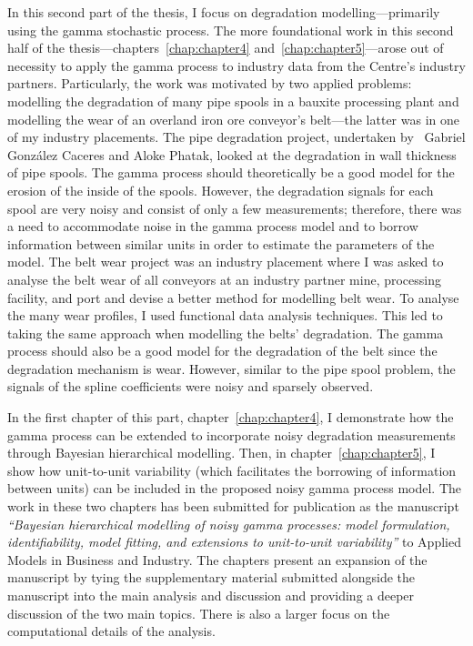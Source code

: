 \documentclass[apa,colorlinks,emptypage]{curtinThesis}
\begin{document}
In this second part of the thesis, I focus on degradation modelling---primarily using the gamma stochastic process. The more foundational work in this second half of the thesis---chapters~\ref{chap:chapter4} and~\ref{chap:chapter5}---arose out of necessity to apply the gamma process to industry data from the Centre's industry partners. Particularly, the work was motivated by two applied problems: modelling the degradation of many pipe spools in a bauxite processing plant and modelling the wear of an overland iron ore conveyor's belt---the latter was in one of my industry placements. The pipe degradation project, undertaken by  Gabriel Gonz\'{a}lez Caceres and Aloke Phatak, looked at the degradation in wall thickness of pipe spools. The gamma process should theoretically be a good model for the erosion of the inside of the spools. However, the degradation signals for each spool are very noisy and consist of only a few measurements; therefore, there was a need to accommodate noise in the gamma process model and to borrow information between similar units in order to estimate the parameters of the model. The belt wear project was an industry placement where I was asked to analyse the belt wear of all conveyors at an industry partner mine, processing facility, and port and devise a better method for modelling belt wear. To analyse the many wear profiles, I used functional data analysis techniques. This led to taking the same approach when modelling the belts' degradation. The gamma process should also be a good model for the degradation of the belt since the degradation mechanism is wear. However, similar to the pipe spool problem, the signals of the spline coefficients were noisy and sparsely observed.

In the first chapter of this part, chapter~\ref{chap:chapter4}, I demonstrate how the gamma process can be extended to incorporate noisy degradation measurements through Bayesian hierarchical modelling. Then, in chapter~\ref{chap:chapter5}, I show how unit-to-unit variability (which facilitates the borrowing of information between units) can be included in the proposed noisy gamma process model. The work in these two chapters has been submitted for publication as the manuscript \textit{``Bayesian hierarchical modelling of noisy gamma processes: model formulation, identifiability, model fitting, and extensions to unit-to-unit variability''} to Applied Models in Business and Industry. The chapters present an expansion of the manuscript by tying the supplementary material submitted alongside the manuscript into the main analysis and discussion and providing a deeper discussion of the two main topics. There is also a larger focus on the computational details of the analysis.
\end{document}
